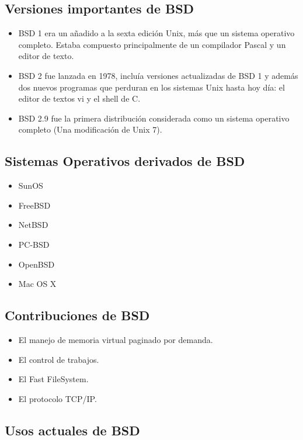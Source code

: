 \subsection{Versiones importantes de BSD}

\begin{itemize}
	\item BSD 1 era un añadido a la sexta edición Unix, más que un sistema operativo completo. Estaba compuesto principalmente de un compilador Pascal y un editor de texto.
	\item BSD 2 fue lanzada en 1978, incluía versiones actualizadas de BSD 1 y además dos nuevos programas que perduran en los sistemas Unix hasta hoy día: el editor de textos vi y el shell de C.
	\item BSD 2.9 fue la primera distribución considerada como un sistema operativo completo (Una modificación de Unix 7).
\end{itemize}

\subsection{Sistemas Operativos derivados de BSD}

\begin{itemize}
	\item SunOS
	\item FreeBSD
	\item NetBSD
	\item PC-BSD
	\item OpenBSD
	\item Mac OS X
\end{itemize}

\subsection{Contribuciones de BSD}

\begin{itemize}
	\item El manejo de memoria virtual paginado por demanda.
	\item El control de trabajos.
	\item El Fast FileSystem.
	\item El protocolo TCP/IP.
\end{itemize}

\subsection{Usos actuales de BSD}


